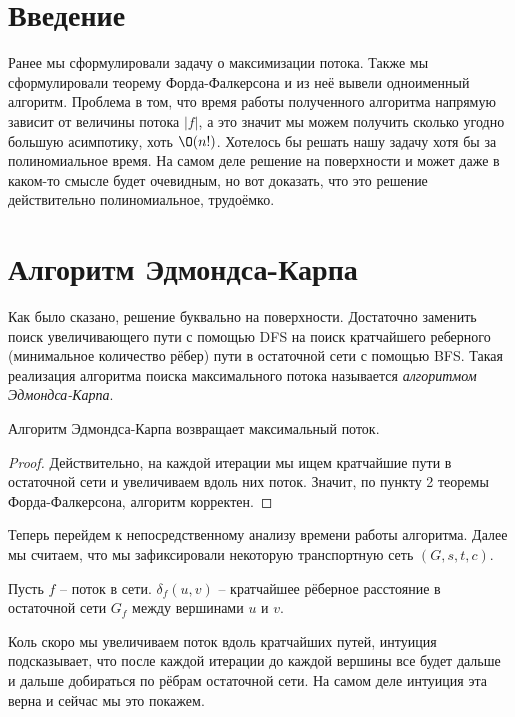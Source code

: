 \section{Введение}

Ранее мы сформулировали задачу о максимизации потока.
Также мы сформулировали теорему Форда-Фалкерсона и из неё вывели одноименный алгоритм.
Проблема в том, что время работы полученного алгоритма напрямую зависит от величины потока $|f|$, а это значит мы можем получить сколько угодно большую асимпотику, хоть $\O(n!)$.
Хотелось бы решать нашу задачу хотя бы за полиномиальное время.
На самом деле решение на поверхности и может даже в каком-то смысле будет очевидным, но вот доказать, что это решение действительно полиномиальное, трудоёмко. 

\section{Алгоритм Эдмондса-Карпа}

Как было сказано, решение буквально на поверхности. Достаточно заменить поиск увеличивающего пути с помощью DFS на поиск кратчайшего реберного (минимальное количество рёбер) пути в остаточной сети с помощью BFS.
Такая реализация алгоритма поиска максимального потока называется \textit{алгоритмом Эдмондса-Карпа}.

\St Алгоритм Эдмондса-Карпа возвращает максимальный поток.
\begin{proof}
    
    Действительно, на каждой итерации мы ищем кратчайшие пути в остаточной сети и увеличиваем вдоль них поток. Значит, по пункту 2 теоремы Форда-Фалкерсона, алгоритм корректен.

\end{proof}

Теперь перейдем к непосредственному анализу времени работы алгоритма. Далее мы считаем, что мы зафиксировали некоторую транспортную сеть $(G, s, t, c)$.

\Def Пусть $f$ -- поток в сети. $\delta_f(u, v)$ -- кратчайшее рёберное расстояние в остаточной сети $G_f$ между вершинами $u$ и $v$.

Коль скоро мы увеличиваем поток вдоль кратчайших путей, интуиция подсказывает, что после каждой итерации до каждой вершины все будет дальше и дальше добираться по рёбрам остаточной сети.
На самом деле интуиция эта верна и сейчас мы это покажем.

